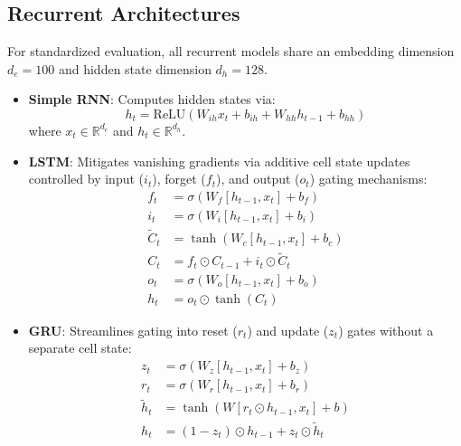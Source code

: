 \documentclass[10pt,twocolumn,letterpaper]{article}
\begin{document}
\subsection{Recurrent Architectures}
For standardized evaluation, all recurrent models share an embedding dimension $d_e = 100$ and hidden state dimension $d_h = 128$.
\begin{itemize}
    \item \textbf{Simple RNN}: Computes hidden states via:
    \begin{equation}
    h_t = \text{ReLU}(W_{ih} x_t + b_{ih} + W_{hh} h_{t-1} + b_{hh})
    \end{equation}
    where $x_t \in \mathbb{R}^{d_e}$ and $h_t \in \mathbb{R}^{d_h}$.
    \item \textbf{LSTM}: Mitigates vanishing gradients via additive cell state updates controlled by input ($i_t$), forget ($f_t$), and output ($o_t$) gating mechanisms:
    \begin{align}
    f_t &= \sigma(W_f [h_{t-1}, x_t] + b_f) \\
    i_t &= \sigma(W_i [h_{t-1}, x_t] + b_i) \\
    \tilde{C}_t &= \tanh(W_c [h_{t-1}, x_t] + b_c) \\
    C_t &= f_t \odot C_{t-1} + i_t \odot \tilde{C}_t \\
    o_t &= \sigma(W_o [h_{t-1}, x_t] + b_o) \\
    h_t &= o_t \odot \tanh(C_t)
    \end{align}
    \item \textbf{GRU}: Streamlines gating into reset ($r_t$) and update ($z_t$) gates without a separate cell state:
    \begin{align}
    z_t &= \sigma(W_z [h_{t-1}, x_t] + b_z) \\
    r_t &= \sigma(W_r [h_{t-1}, x_t] + b_r) \\
    \tilde{h}_t &= \tanh(W [r_t \odot h_{t-1}, x_t] + b) \\
    h_t &= (1 - z_t) \odot h_{t-1} + z_t \odot \tilde{h}_t
    \end{align}
\end{itemize}
\end{document}
